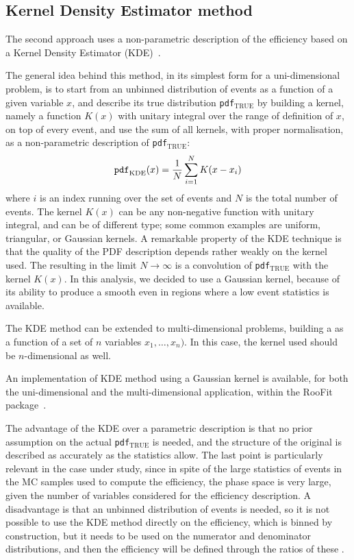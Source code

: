 \subsection{Kernel Density Estimator method}\label{sec:eff_kde}
The second approach uses a non-parametric description of the efficiency based on a Kernel Density Estimator (KDE)~\cite{opac-b1089297,Cranmer:2000du}.

The general idea behind this method, in its simplest form for a uni-dimensional problem, is to start from an unbinned distribution of events as a function of a given variable $x$, and describe its true distribution {\texttt{pdf}$_{\mathrm{TRUE}}$} by building a kernel, namely a function $K(x)$ with unitary integral over the range of definition of $x$, on top of every event, and use the sum of all kernels, with proper normalisation, as a non-parametric description of {\texttt{pdf}$_{\mathrm{TRUE}}$}:
\begin{equation}\label{eq:KDE}
    \mathtt{pdf}_{\mathrm{KDE}}(x)=\frac{1}{N}\sum_{i=1}^{N} K(x-x_i)
\end{equation}
where $i$ is an index running over the set of events and $N$ is the total number of events.
The kernel $K(x)$ can be any non-negative function with unitary integral, and can be of different type; some common examples are uniform, triangular, or Gaussian kernels.
A remarkable property of the KDE technique is that the quality of the PDF description depends rather weakly on the kernel used.
The resulting \pdfKDEx in the limit $N\to\infty$ is a convolution of {\texttt{pdf}$_{\mathrm{TRUE}}$} with the kernel $K(x)$.
In this analysis, we decided to use a Gaussian kernel, because of its ability to produce a smooth \pdf even in regions where a low event statistics is available.

The KDE method can be extended to multi-dimensional problems, building a \pdf as a function of a set of $n$ variables $x_1,\ldots,x_n)$.
In this case, the kernel used should be $n$-dimensional as well.

An implementation of KDE method using a Gaussian kernel is available, for both the uni-dimensional and the multi-dimensional application, within the {\sc RooFit} package~\cite{RooFit}.

The advantage of the KDE over a parametric description is that no prior assumption on the actual {\texttt{pdf}$_{\mathrm{TRUE}}$} is needed, and the structure of the original \pdf is described as accurately as the statistics allow.
The last point is particularly relevant in the case under study, since in spite of the large statistics of events in the MC samples used to compute the efficiency, the phase space is very large, given the number of variables considered for the efficiency description.
A disadvantage is that an unbinned distribution of events is needed, so it is not possible to use the KDE method directly on the efficiency, which is binned by construction, but it needs to be used on the numerator and denominator distributions, and then the efficiency will be defined through the ratios of these \pdfs.

